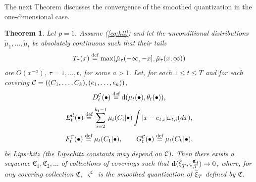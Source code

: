 \documentclass{article}              %
\newtheorem{theorem}{Theorem}
\begin{document}
\noindent The next Theorem discusses the convergence of the smoothed quantization
in the one-dimensional case.
\begin{theorem}
\label{thm:conv}Let $p=1$. Assume (\ref{eq:htl}) and let the unconditional distributions  $\tilde{\mu}_{1},\dots,\tilde{\mu}_{t}$
be absolutely continuous such that their tails $$T_\tau(x) \stackrel{\text{\rm def}}{=} \max(\tilde \mu_\tau(-\infty,-x],\tilde \mu_\tau(x,\infty))$$ are $O(x^{-a})$, $\tau=1,\dots,t$,
for some $a>1$. Let, for each $1\leq t\leq T$ and for each covering
$\mathcal{C}=((C_{1},\dots,C_{k}),(e_{1},\dots,e_{k}))$,
\begin{equation}
D_{t}^{\mathcal{C}}(\bullet)\stackrel{\text{\rm def}}{=}\mathrm{d}(\mu_{t}(\bullet),\theta_{t}(\bullet)),\label{eq:firstlip}
\end{equation}
\textup{\emph{
\begin{equation}
E_{t}^{\mathcal{C}}(\bullet)\stackrel{\text{\rm def}}{=}\sum_{i=2}^{k_{t}-1}\mu_{t}(C_{i}|\bullet)\int|x-e_{t,i}|\omega_{t,i}(dx),\label{eq:seclip}
\end{equation}
\begin{equation}
F_{t}^{\mathcal{C}}(\bullet)\stackrel{\text{\rm def}}{=}\mu_{t}(C_{1}|\bullet),\qquad G_{t}^{\mathcal{C}}(\bullet)\stackrel{\text{\rm def}}{=}\mu_{t}(C_{k}|\bullet),\label{eq:thirdlip}
\end{equation}
be Lipschitz (the Lipschitz constants may depend on $\mathcal{C}).$ Then }}there
exists a sequence $\mathfrak{C}_{1},\mathfrak{C}_{2},\dots$ of collections
of coverings such that $\mathbf{d}(\overline{\xi}_{T},\overline{\varsigma}_{,T}^{\boldsymbol{\mathfrak{C}_{i}}})\rightarrow0$,
where, for any covering collection $\mathfrak{C},$ $\varsigma^{\mathfrak{C}}$
is the smoothed quantization of $\overline{\xi}_{T}$ defined by $\mathfrak{C}$.
\end{theorem}
\end{document}
